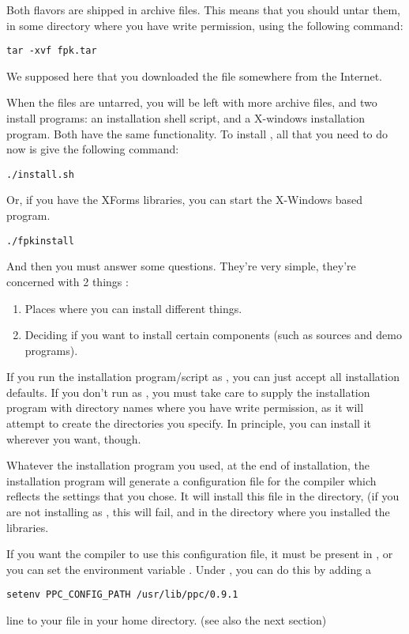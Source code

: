 \documentclass{report}
\begin{document}
Both flavors are shipped in  archive files.
This means that you should untar them, in some directory where you have
write permission, using the following command:
\begin{verbatim}
tar -xvf fpk.tar
\end{verbatim}
We supposed here that you downloaded the file  somewhere
from the Internet.

When the files are untarred, you will be left with more archive files, and
two install programs: an installation shell script, and a X-windows
installation program. Both have the same functionality.
To install \fpk, all that you need to do now is give the following command:
\begin{verbatim}
./install.sh
\end{verbatim}
Or, if you have the XForms libraries, you can start the X-Windows based
program.
\begin{verbatim}
./fpkinstall
\end{verbatim}
And then you must answer some questions. They're very simple, they're
concerned with 2 things :
\begin{enumerate}
\item Places where you can install different things.
\item Deciding if you want to install certain components (such as sources
and demo programs).
\end{enumerate}
If you run the installation program/script  as , you can just accept all installation
defaults. If you don't run as , you must take care to supply the
installation program with directory names where you have write permission,
as it will attempt to create the directories you specify.
In principle, you can install it wherever you want, though.

Whatever the installation program you used, 
at the end of installation, the installation program will generate a
configuration file for the \fpk compiler which reflects the settings
that you chose. It will install this file in the  directory, (if
you are not installing as , this will fail, and in the
directory where you installed the libraries.

If you want the \fpk compiler to use this configuration file, it must be
present in , or you can set the environment variable
. Under , you can do this by adding  a 
\begin{verbatim}
setenv PPC_CONFIG_PATH /usr/lib/ppc/0.9.1
\end{verbatim}
line to your  file in your home directory. 
(see also the next section) 
\end{document}
